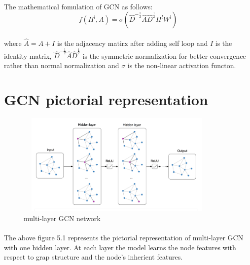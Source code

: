 \paragraph{} The mathematical fomulation of GCN as follows:
\begin{equation}
    f(H^l,A) = \sigma(\hat{D}^{-\frac{1}{2}} \hat{A} \hat{D}^{\frac{1}{2}} H^l W^l)
\end{equation}
\paragraph{} where $\hat{A} = A+I$ is the adjacency matirx after adding self loop and $I$ is the identity matrix,
$\hat{D}^{-\frac{1}{2}} \hat{A} \hat{D}^{\frac{1}{2}}$ is the symmetric normalization for better convergence rather than 
normal normalization and $\sigma$ is the non-linear activation functon.
\section{GCN pictorial representation}
\begin{figure}[h]
    \centering
    \includegraphics[width=10cm,height=5cm]{tex/img/GCN.png}
    \caption{multi-layer GCN network}
\end{figure}
\paragraph{} The above figure 5.1 represents the pictorial representation of multi-layer GCN with one hidden layer.
At each layer the model learns the node features with respect to grap structure and the node's inherient features.
